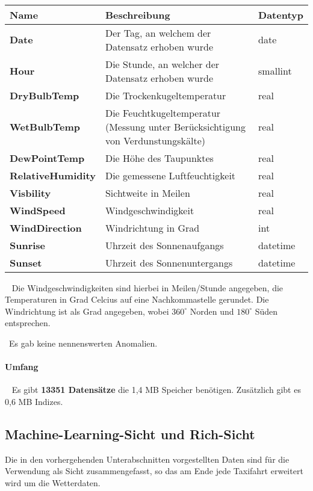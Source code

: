 ~\newline
\begin{center}
	\begin{tabular}{|p{}|p{}|p{}|}
		\hline
		Name & Beschreibung & Datentyp  \\ \hline
		\textbf{Date} & Der Tag, an welchem der Datensatz erhoben wurde & date \\ \hline
		\textbf{Hour} & Die Stunde, an welcher der Datensatz erhoben wurde & smallint \\ \hline
		\textbf{DryBulbTemp} & Die Trockenkugeltemperatur & real \\ \hline
		\textbf{WetBulbTemp} & Die Feuchtkugeltemperatur (Messung unter Berücksichtigung von Verdunstungskälte) & real \\ \hline	
		\textbf{DewPointTemp} & Die Höhe des Taupunktes & real\\ \hline
		\textbf{RelativeHumidity} & Die gemessene Luftfeuchtigkeit & real \\ \hline 
		\textbf{Visbility} & Sichtweite in Meilen & real\\ \hline
		\textbf{WindSpeed} & Windgeschwindigkeit & real\\ \hline
		\textbf{WindDirection} & Windrichtung in Grad & int \\ \hline
		\textbf{Sunrise} & Uhrzeit des Sonnenaufgangs & datetime \\ \hline
		\textbf{Sunset} & Uhrzeit des Sonnenuntergangs & datetime \\ \hline
	\end{tabular}
\end{center}
~\newline
Die Windgeschwindigkeiten sind hierbei in Meilen/Stunde angegeben, die Temperaturen in Grad Celcius auf eine Nachkommastelle gerundet. Die Windrichtung ist als Grad angegeben, wobei $360^\circ$ Norden und $180^\circ $ Süden entsprechen.

~\newline Es gab keine nennenswerten Anomalien. 
\paragraph{Umfang} ~\newline
Es gibt \textbf{13351 Datensätze} die 1,4 MB Speicher benötigen. Zusätzlich gibt es 0,6 MB Indizes.

\subsection{Machine-Learning-Sicht und Rich-Sicht}
Die in den vorhergehenden Unterabschnitten vorgestellten Daten sind für die Verwendung als Sicht zusammengefasst, so das am Ende jede Taxifahrt erweitert wird um die Wetterdaten. 

